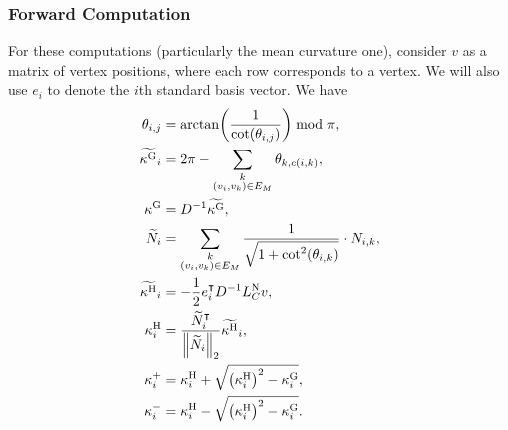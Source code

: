 \subsubsection{Forward Computation}
For these computations (particularly the mean curvature one), consider \(v\) as a matrix of vertex positions, where each row corresponds to a vertex. We will also use \(e_i\) to denote the \(i\)th standard basis vector. We have \begin{align*}
	\theta_{i, j} &= \arctan\pof{\frac{1}{\cot\pof{\theta_{i, j}}}} \bmod \pi, \\
	\widetilde{\kappa^\text{G}}_i &= 2\pi - \sum_{\substack{k \\ \pof{v_i, v_k} \in E_M}} \theta_{k, c\pof{i, k}}, \\
	\kappa^\text{G} &= D^{-1}\widetilde{\kappa^\text{G}}, \\
	\widetilde{N}_i &= \sum_{\substack{k \\ \pof{v_i, v_k} \in E_M}} \frac{1}{\sqrt{1 + \cot^2\pof{\theta_{i, k}}}} \cdot N_{i, k}, \\
	\widetilde{\kappa^\text{H}}_i &= -\frac{1}{2}e_i^\intercal D^{-1}L_C^{\text{N}}v, \\
	\kappa^\text{H}_i &= \frac{\widetilde{N}_i^\intercal}{\norm{\widetilde{N}_i}_2}\widetilde{\kappa^\text{H}}_i, \\
	\kappa^+_i &= \kappa^{\text{H}}_i + \sqrt{\pof{\kappa^{\text{H}}_i}^2 - \kappa^{\text{G}}_i}, \\
	\kappa^-_i &= \kappa^{\text{H}}_i - \sqrt{\pof{\kappa^{\text{H}}_i}^2 - \kappa^{\text{G}}_i}.
\end{align*}

